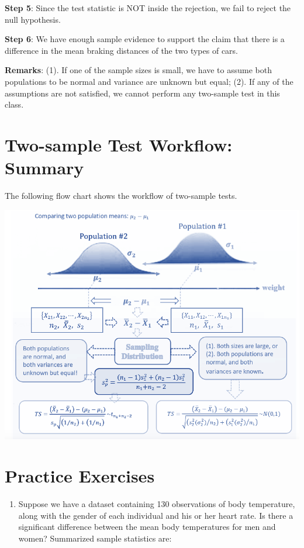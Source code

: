 \documentclass[
]{book}
\providecommand{\tightlist}{%
  \setlength{\itemsep}{0pt}\setlength{\parskip}{0pt}}
\begin{document}
\textbf{Step 5}: Since the test statistic is NOT inside the rejection, we fail to reject the null hypothesis.

\textbf{Step 6}: We have enough sample evidence to support the claim that there is a difference in the mean braking distances of the two types of cars.

\textbf{Remarks}: (1). If one of the sample sizes is small, we have to assume both populations to be normal and variance are unknown but equal; (2). If any of the assumptions are not satisfied, we cannot perform any two-sample test in this class.

\hfill\break

\hypertarget{two-sample-test-workflow-summary}{%
\section{Two-sample Test Workflow: Summary}\label{two-sample-test-workflow-summary}}

The following flow chart shows the workflow of two-sample tests.

\includegraphics[width=0.7\linewidth]{week11/twoSampleWorkFlow}

\hfill\break

\hypertarget{practice-exercises-4}{%
\section{Practice Exercises}\label{practice-exercises-4}}

\begin{enumerate}
\def\labelenumi{\arabic{enumi}.}
\tightlist
\item
  Suppose we have a dataset containing 130 observations of body temperature, along with the gender of each individual and his or her heart rate. Is there a significant difference between the mean body temperatures for men and women? Summarized sample statistics are:
\end{enumerate}
\end{document}
